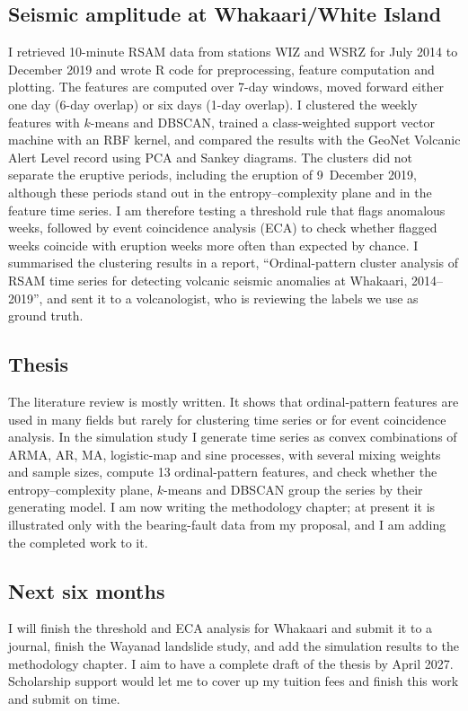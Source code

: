 \documentclass[11pt,a4paper]{article}
\begin{document}
\subsection*{Seismic amplitude at Whakaari/White Island}
I retrieved 10-minute RSAM data from stations WIZ and WSRZ for July 2014 to December 2019 and wrote R code for preprocessing, feature computation and plotting.
	The features are computed over 7-day windows, moved forward either one day (6-day overlap) or six days (1-day overlap).
I clustered the weekly features with $k$-means and DBSCAN, trained a class-weighted support vector machine with an RBF kernel, and compared the results with the GeoNet Volcanic Alert Level record using PCA and Sankey diagrams.
The clusters did not separate the eruptive periods, including the eruption of 9~December 2019, although these periods stand out in the entropy--complexity plane and in the feature time series.
I am therefore testing a threshold rule that flags anomalous weeks, followed by event coincidence analysis (ECA) to check whether flagged weeks coincide with eruption weeks more often than expected by chance.
I summarised the clustering results in a report, ``Ordinal-pattern cluster analysis of RSAM time series for detecting volcanic seismic anomalies at Whakaari, 2014--2019'', and sent it to a volcanologist, who is reviewing the labels we use as ground truth.
	
\subsection*{Thesis}
The literature review is mostly written.
It shows that ordinal-pattern features are used in many fields but rarely for clustering time series or for event coincidence analysis.
In the simulation study I generate time series as convex combinations of ARMA, AR, MA, logistic-map and sine processes, with several mixing weights and sample sizes, compute 13 ordinal-pattern features, and check whether the entropy--complexity plane, $k$-means and DBSCAN group the series by their generating model.
I am now writing the methodology chapter; at present it is illustrated only with the bearing-fault data from my proposal, and I am adding the completed work to it.
	
\subsection*{Next six months}
I will finish the threshold and ECA analysis for Whakaari and submit it to a journal, finish the Wayanad landslide study, and add the simulation results to the methodology chapter.
I aim to have a complete draft of the thesis by April 2027.
Scholarship support would let me to cover up my tuition fees and finish this work and submit on time.
	
\end{document}
